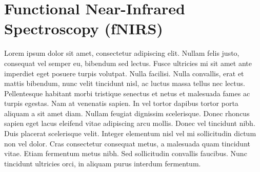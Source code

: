 \chapter{Functional Near-Infrared Spectroscopy (fNIRS)}

Lorem ipsum dolor sit amet, consectetur adipiscing elit. Nullam felis justo, consequat vel semper eu, bibendum sed lectus. Fusce ultricies mi sit amet ante imperdiet eget posuere turpis volutpat. Nulla facilisi. Nulla convallis, erat et mattis bibendum, nunc velit tincidunt nisl, ac luctus massa tellus nec lectus. Pellentesque habitant morbi tristique senectus et netus et malesuada fames ac turpis egestas. Nam at venenatis sapien. In vel tortor dapibus tortor porta aliquam a sit amet diam. Nullam feugiat dignissim scelerisque. Donec rhoncus sapien eget lacus eleifend vitae adipiscing arcu mollis. Donec vel tincidunt nibh. Duis placerat scelerisque velit. Integer elementum nisl vel mi sollicitudin dictum non vel dolor. Cras consectetur consequat metus, a malesuada quam tincidunt vitae. Etiam fermentum metus nibh. Sed sollicitudin convallis faucibus. Nunc tincidunt ultricies orci, in aliquam purus interdum fermentum. 